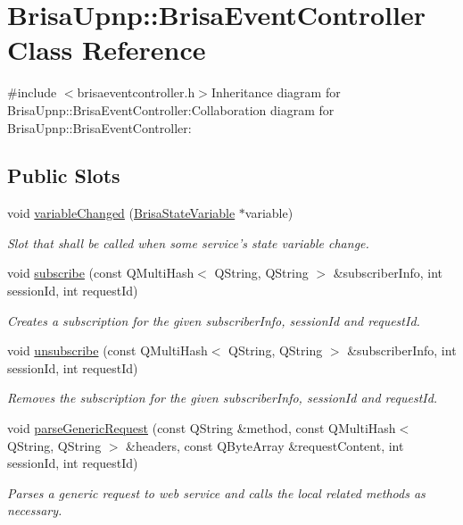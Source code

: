 \hypertarget{classBrisaUpnp_1_1BrisaEventController}{
\section{BrisaUpnp::BrisaEventController Class Reference}
\label{classBrisaUpnp_1_1BrisaEventController}
}


{\ttfamily \#include $<$brisaeventcontroller.h$>$}Inheritance diagram for BrisaUpnp::BrisaEventController:Collaboration diagram for BrisaUpnp::BrisaEventController:\subsection*{Public Slots}
\begin{DoxyCompactItemize}
\item 
void \hyperlink{classBrisaUpnp_1_1BrisaEventController_a59db4e5d9646da37a2983840dad09485}{variableChanged} (\hyperlink{classBrisaUpnp_1_1BrisaStateVariable}{BrisaStateVariable} $\ast$variable)
\begin{DoxyCompactList}\small\item\em Slot that shall be called when some service's state {\itshape variable\/} change. \item\end{DoxyCompactList}\item 
void \hyperlink{classBrisaUpnp_1_1BrisaEventController_a3037ef7625561ca5576b70c56fe6bcb4}{subscribe} (const QMultiHash$<$ QString, QString $>$ \&subscriberInfo, int sessionId, int requestId)
\begin{DoxyCompactList}\small\item\em Creates a subscription for the given {\itshape subscriberInfo\/}, {\itshape sessionId\/} and {\itshape requestId\/}. \item\end{DoxyCompactList}\item 
void \hyperlink{classBrisaUpnp_1_1BrisaEventController_a56b890f9eb211152063260f07d40f5f0}{unsubscribe} (const QMultiHash$<$ QString, QString $>$ \&subscriberInfo, int sessionId, int requestId)
\begin{DoxyCompactList}\small\item\em Removes the subscription for the given {\itshape subscriberInfo\/}, {\itshape sessionId\/} and {\itshape requestId\/}. \item\end{DoxyCompactList}\item 
void \hyperlink{classBrisaUpnp_1_1BrisaEventController_a0324a5ff469a2ecdaa569dfbd6517111}{parseGenericRequest} (const QString \&method, const QMultiHash$<$ QString, QString $>$ \&headers, const QByteArray \&requestContent, int sessionId, int requestId)
\begin{DoxyCompactList}\small\item\em Parses a generic request to web service and calls the local related methods as necessary. \item\end{DoxyCompactList}\end{DoxyCompactItemize}

